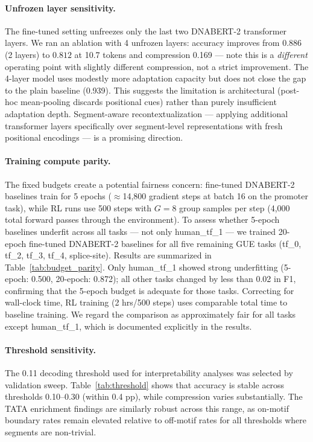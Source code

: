 \documentclass[sigconf,screen]{acmart}
\newcommand{\dnabert}{DNABERT-2\xspace}
\begin{document}
\paragraph{Unfrozen layer sensitivity.}
The fine-tuned setting unfreezes only the last two \dnabert transformer layers. We ran an ablation with 4 unfrozen layers: accuracy improves from $0.886$ (2 layers) to $0.812$ at 10.7 tokens and compression 0.169 — note this is a \emph{different} operating point with slightly different compression, not a strict improvement. The 4-layer model uses modestly more adaptation capacity but does not close the gap to the plain baseline (0.939). This suggests the limitation is architectural (post-hoc mean-pooling discards positional cues) rather than purely insufficient adaptation depth. Segment-aware recontextualization — applying additional transformer layers specifically over segment-level representations with fresh positional encodings — is a promising direction.

\paragraph{Training compute parity.}
The fixed budgets create a potential fairness concern: fine-tuned \dnabert baselines train for 5 epochs ($\approx$14,800 gradient steps at batch 16 on the promoter task), while RL runs use 500 steps with $G=8$ group samples per step (4,000 total forward passes through the environment). To assess whether 5-epoch baselines underfit across all tasks — not only human\_tf\_1 — we trained 20-epoch fine-tuned \dnabert baselines for all five remaining GUE tasks (tf\_0, tf\_2, tf\_3, tf\_4, splice-site). Results are summarized in Table~\ref{tab:budget_parity}. Only human\_tf\_1 showed strong underfitting (5-epoch: 0.500, 20-epoch: 0.872); all other tasks changed by less than 0.02 in F1, confirming that the 5-epoch budget is adequate for those tasks. Correcting for wall-clock time, RL training (2 hrs/500 steps) uses comparable total time to baseline training. We regard the comparison as approximately fair for all tasks except human\_tf\_1, which is documented explicitly in the results.

\paragraph{Threshold sensitivity.}
The 0.11 decoding threshold used for interpretability analyses was selected by validation sweep. Table~\ref{tab:threshold} shows that accuracy is stable across thresholds 0.10--0.30 (within 0.4 pp), while compression varies substantially. The TATA enrichment findings are similarly robust across this range, as on-motif boundary rates remain elevated relative to off-motif rates for all thresholds where segments are non-trivial.
\end{document}
